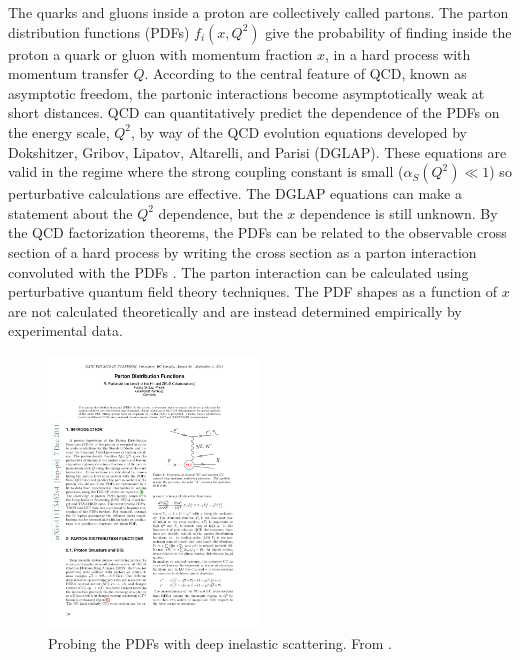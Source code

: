 The quarks and gluons inside a proton are collectively called partons.
The parton distribution functions (PDFs) $f_i(x,Q^2)$ give the probability of finding inside the proton a quark or gluon with momentum fraction $x$, in a hard process with momentum transfer $Q$.
According to the central feature of QCD, known as asymptotic freedom, the partonic interactions become asymptotically weak at short distances.
QCD can quantitatively predict the dependence of the PDFs on the energy scale, $Q^2$,
by way of the QCD evolution equations developed by Dokshitzer, Gribov, Lipatov, Altarelli, and Parisi (DGLAP).
These equations are valid in the regime where the strong coupling constant is small ($\alpha_S(Q^2) \ll 1$) so perturbative calculations are effective.
The DGLAP equations can make a statement about the $Q^2$ dependence, but the $x$ dependence is still unknown.
By the QCD factorization theorems, the PDFs can be related to the observable cross section of a
hard process by writing the cross section as a parton interaction convoluted with the PDFs \cite{Collins:1989gx}.
The parton interaction can be calculated using perturbative quantum field theory techniques.
The PDF shapes as a function of $x$ are not calculated theoretically and are instead determined empirically by experimental data.

\begin{figure}[hb]
  \centering
    \includegraphics[width=0.50\textwidth]{figures/dis.pdf}
  \caption{Probing the PDFs with deep inelastic scattering. From \cite{Placakyte:2011az}.} 
  \label{fig:dis}
\end{figure}

